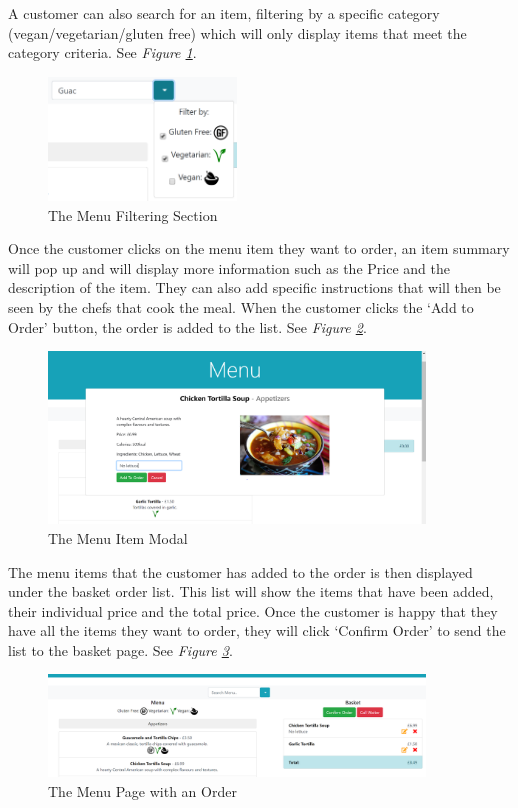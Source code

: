 \documentclass[12pt, twoside, a4paper]{report}
\begin{document}
A customer can also search for an item, filtering by a specific category (vegan/vegetarian/gluten free) which will only display items that meet the category criteria. See \textit{Figure \ref{fig:menuFilter}}.

\begin{figure}[H]
  \centering
  \includegraphics[width=5cm]{MenuFilter.png}
  \caption{The Menu Filtering Section}
  \label{fig:menuFilter}
\end{figure}

Once the customer clicks on the menu item they want to order, an item summary will pop up and will display more information such as the Price and the description of the item.
They can also add specific instructions that will then be seen by the chefs that cook the meal.
When the customer clicks the ‘Add to Order’ button, the order is added to the list.
See \textit{Figure \ref{fig:menuItem}}.

\begin{figure}[H]
  \centering
  \includegraphics[width=10cm]{MenuItem.png}
  \caption{The Menu Item Modal}
  \label{fig:menuItem}
\end{figure}

The menu items that the customer has added to the order is then displayed under the basket order list. This list will show the items that have been added, their individual price and the total price. Once the customer is happy that they have all the items they want to order, they will click ‘Confirm Order’ to send the list to the basket page. See \textit{Figure \ref{fig:menuOrder}}.

\begin{figure}[H]
  \centering
  \includegraphics[width=10cm]{MenuOrder.png}
  \caption{The Menu Page with an Order}
  \label{fig:menuOrder}
\end{figure}
\end{document}
